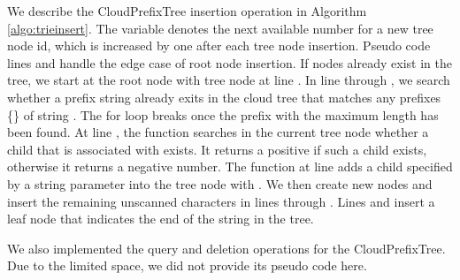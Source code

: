 \documentclass[10pt, conference, compsocconf]{IEEEtran}
\newcommand{\remove}[1]{}
\begin{document}
\remove{
Algorithm \ref{algo:triequery} shows the pseudo code for the CloudPrefixTree query operation.
For each character   in the query string, we search in the current tree node whether there exists a child that is associated with
 . The function  returns a positive  for such a child if exists, otherwise returns a negative number.
 If the child does exist, that child becomes the current tree node and we repeat the previous step for the next character .
 The  function  has to retrieve the current tree node stored in the cloud via Internet. 
 }
 
We describe the CloudPrefixTree insertion operation in Algorithm \ref{algo:trieinsert}.
The variable  denotes the next available number for a new tree node id, which 
is increased by one after each tree node insertion.
Pseudo code lines  and  handle the edge case of root node insertion. 
If nodes already exist in the tree,
we start at the root node with tree node  at line . In line  through , 
we search whether a prefix string already exits in the cloud tree that 
matches any prefixes \{\} of string .
The for loop breaks once the prefix with the maximum length has been found.
 At line , the function  searches in the current tree node whether a child that is associated with  exists.
 It returns a positive  if such a child exists, otherwise it returns a negative number.
The function  at line  adds a child specified by a string parameter  into the tree node with 
.
We then create new nodes and insert the remaining unscanned characters  
in lines  through . Lines  and  insert a leaf node that indicates the end of the string 
in the tree.

We also implemented the query and deletion operations for the CloudPrefixTree.
Due to the limited space, we did not provide its pseudo code here.
\end{document}
